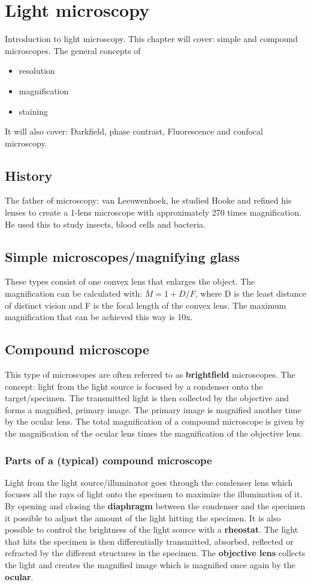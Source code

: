 \section{Light microscopy}
Introduction to light microscopy. This chapter will cover: simple and compound microscopes. The general concepts of 
\begin{itemize}
	\item resolution
	\item magnification
	\item staining
\end{itemize}
It will also cover: Darkfield, phase contrast, Fluorescence and confocal microscopy.

	\subsection*{History}
	The father of microscopy: van Leeuwenhoek, he studied Hooke and refined his lenses to create a 1-lens microscope with approximately 270 times magnification. He used this to study insects, blood cells and bacteria. 


	\subsection*{Simple microscopes/magnifying glass}
	These types consist of one convex lens that enlarges the object. The magnification can be calculated with: $M = 1 + D/F$, where D is the least distance of distinct vision and F is the focal length of the convex lens. The maximum magnification that can be achieved this way is 10x. 

	\subsection*{Compound microscope}
	This type of microscopes are often referred to as \textbf{brightfield} microscopes. The concept: light from the light source is focused by a condenser onto the target/specimen. The transmitted light is then collected by the objective and forms a magnified, primary image. The primary image is magnified another time by the ocular lens. The total magnification of a compound microscope is given by the magnification of the ocular lens times the magnification of the objective lens. 

		\subsubsection*{Parts of a (typical) compound microscope}
		Light from the light source/illuminator goes through the condenser lens which focuses all the rays of light onto the specimen to maximize the illumination of it. By opening and closing the \textbf{diaphragm} between the condenser and the specimen it possible to adjust the amount of the light hitting the specimen. It is also possible to control the brightness of the light source with a \textbf{rheostat}. The light that hits the specimen is then differentially transmitted, absorbed, reflected or refracted by the different structures in the specimen. The \textbf{objective lens} collects the light and creates the magnified image which is magnified once again by the \textbf{ocular}. 

